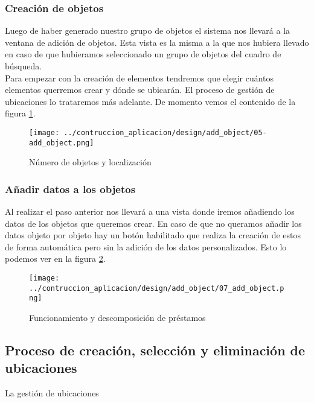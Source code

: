 \subsubsection{Creación de objetos}
Luego de haber generado nuestro grupo de objetos el sistema nos llevará a la ventana de adición de objetos. Esta vista es la misma a la que nos hubiera llevado en caso de que hubieramos seleccionado un grupo de objetos del cuadro de búsqueda.
\\Para empezar con la creación de elementos tendremos que elegir cuántos elementos querremos crear y dónde se ubicarán. El proceso de gestión de ubicaciones lo trataremos más adelante. De momento vemos el contenido de la figura \ref{fig:4-creation-o}.

\begin{figure}[h]
    \centering
    \texttt{[image: ../contruccion\_aplicacion/design/add\_object/05-add\_object.png]}
    \caption{Número de objetos y localización}\label{fig:4-creation-o}
\end{figure}

\subsubsection{Añadir datos a los objetos}
Al realizar el paso anterior nos llevará a una vista donde iremos añadiendo los datos de los objetos que queremos crear. En caso de que no queramos añadir los datos objeto por objeto hay un botón habilitado que realiza la creación de estos de forma automática pero sin la adición de los datos personalizados. Esto lo podemos ver en la figura \ref{fig:5-creation-o}.
\begin{figure}[h]
    \centering
    \texttt{[image: ../contruccion\_aplicacion/design/add\_object/07\_add\_object.png]}
    \caption{Funcionamiento y descomposición de préstamos}\label{fig:5-creation-o}
\end{figure}

\subsection{Proceso de creación, selección y eliminación de ubicaciones}
La gestión de ubicaciones